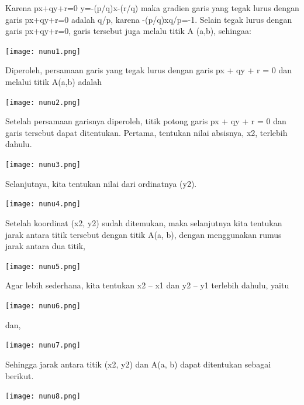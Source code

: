 \documentclass[11pt,fleqn]{book} %
\begin{document}
Karena px+qy+r=0 y=-(p/q)x-(r/q) maka gradien garis yang tegak lurus dengan garis px+qy+r=0 adalah q/p, karena -(p/q)xq/p=-1. Selain tegak lurus dengan garis px+qy+r=0, garis tersebut juga melalu titik A (a,b), sehingaa:

\begin{center}
\texttt{[image: nunu1.png]}
\end{center}

Diperoleh, persamaan garis yang tegak lurus dengan garis px + qy + r = 0 dan melalui titik A(a,b) adalah

\begin{center}
\texttt{[image: nunu2.png]}
\end{center}

Setelah persamaan garisnya diperoleh, titik potong garis px + qy + r = 0 dan garis tersebut dapat ditentukan. Pertama, tentukan nilai absisnya, x2,  terlebih dahulu.

\begin{center}
\texttt{[image: nunu3.png]}
\end{center}

Selanjutnya, kita tentukan nilai dari ordinatnya (y2).

\begin{center}
\texttt{[image: nunu4.png]}
\end{center}

Setelah koordinat (x2, y2) sudah ditemukan, maka selanjutnya kita tentukan jarak antara titik tersebut dengan titik A(a, b), dengan menggunakan rumus jarak antara dua titik,

\begin{center}
\texttt{[image: nunu5.png]}
\end{center}

Agar lebih sederhana, kita tentukan x2 – x1 dan y2 – y1 terlebih dahulu, yaitu

\begin{center}
\texttt{[image: nunu6.png]}
\end{center}

dan,

\begin{center}
\texttt{[image: nunu7.png]}
\end{center}

Sehingga jarak antara titik (x2, y2) dan A(a, b) dapat ditentukan sebagai berikut.

\begin{center}
\texttt{[image: nunu8.png]}
\end{center}
\end{document}
